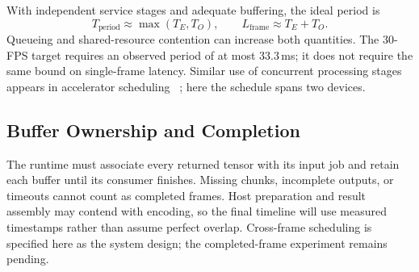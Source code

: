 With independent service stages and adequate buffering, the ideal period is
\begin{equation}
  T_{\mathrm{period}}\approx\max(T_E,T_O),\qquad
  L_{\mathrm{frame}}\approx T_E+T_O.
  \label{eq:pipeline}
\end{equation}
Queueing and shared-resource contention can increase both quantities. The
30-FPS target requires an observed period of at most 33.3\,ms; it does not
require the same bound on single-frame latency. Similar use of concurrent
processing stages appears in accelerator scheduling
~\cite{symons2022stream,li2025gaurast}; here the schedule spans two devices.

\subsection{Buffer Ownership and Completion}
The runtime must associate every returned tensor with its input job and
retain each buffer until its consumer finishes. Missing chunks, incomplete
outputs, or timeouts cannot count as completed frames. Host preparation and
result assembly may contend with encoding, so the final timeline will use
measured timestamps rather than assume perfect overlap. Cross-frame
scheduling is specified here as the system design; the completed-frame
experiment remains pending.
